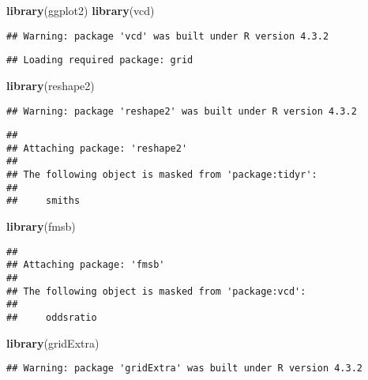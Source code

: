 \documentclass[
]{article}
\newenvironment{Shaded}{\begin{snugshade}}{\end{snugshade}}
\newcommand{\FunctionTok}[1]{\textcolor[rgb]{0.13,0.29,0.53}{\textbf{#1}}}
\newcommand{\NormalTok}[1]{#1}
\begin{document}
\begin{Shaded}
\begin{Highlighting}[]
\FunctionTok{library}\NormalTok{(ggplot2)}
\FunctionTok{library}\NormalTok{(vcd)}
\end{Highlighting}
\end{Shaded}

\begin{verbatim}
## Warning: package 'vcd' was built under R version 4.3.2
\end{verbatim}

\begin{verbatim}
## Loading required package: grid
\end{verbatim}

\begin{Shaded}
\begin{Highlighting}[]
\FunctionTok{library}\NormalTok{(reshape2)}
\end{Highlighting}
\end{Shaded}

\begin{verbatim}
## Warning: package 'reshape2' was built under R version 4.3.2
\end{verbatim}

\begin{verbatim}
## 
## Attaching package: 'reshape2'
## 
## The following object is masked from 'package:tidyr':
## 
##     smiths
\end{verbatim}

\begin{Shaded}
\begin{Highlighting}[]
\FunctionTok{library}\NormalTok{(fmsb)}
\end{Highlighting}
\end{Shaded}

\begin{verbatim}
## 
## Attaching package: 'fmsb'
## 
## The following object is masked from 'package:vcd':
## 
##     oddsratio
\end{verbatim}

\begin{Shaded}
\begin{Highlighting}[]
\FunctionTok{library}\NormalTok{(gridExtra)}
\end{Highlighting}
\end{Shaded}

\begin{verbatim}
## Warning: package 'gridExtra' was built under R version 4.3.2
\end{verbatim}
\end{document}
